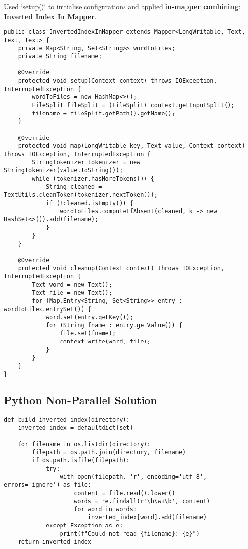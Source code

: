 Used `setup()` to initialise configurations and applied \textbf{in-mapper combining}: \textbf{Inverted Index In Mapper}.


\begin{lstlisting}[style=javastyle,label={lst:inverted-index-in-mapper},caption={Inverted Index In Mapper}]
public class InvertedIndexInMapper extends Mapper<LongWritable, Text, Text, Text> {
    private Map<String, Set<String>> wordToFiles;
    private String filename;

    @Override
    protected void setup(Context context) throws IOException, InterruptedException {
        wordToFiles = new HashMap<>();
        FileSplit fileSplit = (FileSplit) context.getInputSplit();
        filename = fileSplit.getPath().getName();
    }

    @Override
    protected void map(LongWritable key, Text value, Context context) throws IOException, InterruptedException {
        StringTokenizer tokenizer = new StringTokenizer(value.toString());
        while (tokenizer.hasMoreTokens()) {
            String cleaned = TextUtils.cleanToken(tokenizer.nextToken());
            if (!cleaned.isEmpty()) {
                wordToFiles.computeIfAbsent(cleaned, k -> new HashSet<>()).add(filename);
            }
        }
    }

    @Override
    protected void cleanup(Context context) throws IOException, InterruptedException {
        Text word = new Text();
        Text file = new Text();
        for (Map.Entry<String, Set<String>> entry : wordToFiles.entrySet()) {
            word.set(entry.getKey());
            for (String fname : entry.getValue()) {
                file.set(fname);
                context.write(word, file);
            }
        }
    }
}
\end{lstlisting}


\subsection{Python Non-Parallel Solution}\label{subsec:python-non-parallel-solution}

\begin{lstlisting}[style=pythonstyle,label={lst:inverted-index-python},caption={Inverted Index Python}]
def build_inverted_index(directory):
    inverted_index = defaultdict(set)

    for filename in os.listdir(directory):
        filepath = os.path.join(directory, filename)
        if os.path.isfile(filepath):
            try:
                with open(filepath, 'r', encoding='utf-8', errors='ignore') as file:
                    content = file.read().lower()
                    words = re.findall(r'\b\w+\b', content)
                    for word in words:
                        inverted_index[word].add(filename)
            except Exception as e:
                print(f"Could not read {filename}: {e}")
    return inverted_index
\end{lstlisting}


